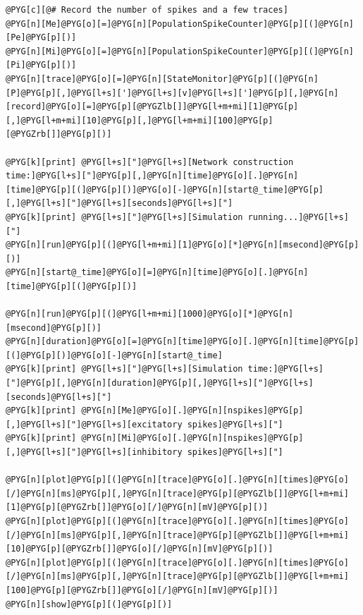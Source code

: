 \documentclass[letterpaper,10pt,english]{manual}
\begin{document}
\begin{Verbatim}[commandchars=@\[\]]
@PYG[c][@# Record the number of spikes and a few traces]
@PYG[n][Me]@PYG[o][=]@PYG[n][PopulationSpikeCounter]@PYG[p][(]@PYG[n][Pe]@PYG[p][)]
@PYG[n][Mi]@PYG[o][=]@PYG[n][PopulationSpikeCounter]@PYG[p][(]@PYG[n][Pi]@PYG[p][)]
@PYG[n][trace]@PYG[o][=]@PYG[n][StateMonitor]@PYG[p][(]@PYG[n][P]@PYG[p][,]@PYG[l+s][']@PYG[l+s][v]@PYG[l+s][']@PYG[p][,]@PYG[n][record]@PYG[o][=]@PYG[p][@PYGZlb[]]@PYG[l+m+mi][1]@PYG[p][,]@PYG[l+m+mi][10]@PYG[p][,]@PYG[l+m+mi][100]@PYG[p][@PYGZrb[]]@PYG[p][)]

@PYG[k][print] @PYG[l+s]["]@PYG[l+s][Network construction time:]@PYG[l+s]["]@PYG[p][,]@PYG[n][time]@PYG[o][.]@PYG[n][time]@PYG[p][(]@PYG[p][)]@PYG[o][-]@PYG[n][start@_time]@PYG[p][,]@PYG[l+s]["]@PYG[l+s][seconds]@PYG[l+s]["]
@PYG[k][print] @PYG[l+s]["]@PYG[l+s][Simulation running...]@PYG[l+s]["]
@PYG[n][run]@PYG[p][(]@PYG[l+m+mi][1]@PYG[o][*]@PYG[n][msecond]@PYG[p][)]
@PYG[n][start@_time]@PYG[o][=]@PYG[n][time]@PYG[o][.]@PYG[n][time]@PYG[p][(]@PYG[p][)]

@PYG[n][run]@PYG[p][(]@PYG[l+m+mi][1000]@PYG[o][*]@PYG[n][msecond]@PYG[p][)]
@PYG[n][duration]@PYG[o][=]@PYG[n][time]@PYG[o][.]@PYG[n][time]@PYG[p][(]@PYG[p][)]@PYG[o][-]@PYG[n][start@_time]
@PYG[k][print] @PYG[l+s]["]@PYG[l+s][Simulation time:]@PYG[l+s]["]@PYG[p][,]@PYG[n][duration]@PYG[p][,]@PYG[l+s]["]@PYG[l+s][seconds]@PYG[l+s]["]
@PYG[k][print] @PYG[n][Me]@PYG[o][.]@PYG[n][nspikes]@PYG[p][,]@PYG[l+s]["]@PYG[l+s][excitatory spikes]@PYG[l+s]["]
@PYG[k][print] @PYG[n][Mi]@PYG[o][.]@PYG[n][nspikes]@PYG[p][,]@PYG[l+s]["]@PYG[l+s][inhibitory spikes]@PYG[l+s]["]

@PYG[n][plot]@PYG[p][(]@PYG[n][trace]@PYG[o][.]@PYG[n][times]@PYG[o][/]@PYG[n][ms]@PYG[p][,]@PYG[n][trace]@PYG[p][@PYGZlb[]]@PYG[l+m+mi][1]@PYG[p][@PYGZrb[]]@PYG[o][/]@PYG[n][mV]@PYG[p][)]
@PYG[n][plot]@PYG[p][(]@PYG[n][trace]@PYG[o][.]@PYG[n][times]@PYG[o][/]@PYG[n][ms]@PYG[p][,]@PYG[n][trace]@PYG[p][@PYGZlb[]]@PYG[l+m+mi][10]@PYG[p][@PYGZrb[]]@PYG[o][/]@PYG[n][mV]@PYG[p][)]
@PYG[n][plot]@PYG[p][(]@PYG[n][trace]@PYG[o][.]@PYG[n][times]@PYG[o][/]@PYG[n][ms]@PYG[p][,]@PYG[n][trace]@PYG[p][@PYGZlb[]]@PYG[l+m+mi][100]@PYG[p][@PYGZrb[]]@PYG[o][/]@PYG[n][mV]@PYG[p][)]
@PYG[n][show]@PYG[p][(]@PYG[p][)]
\end{Verbatim}

\resetcurrentobjects
\hypertarget{--doc-examples-misc_cobahh_simplified}{}
\end{document}
